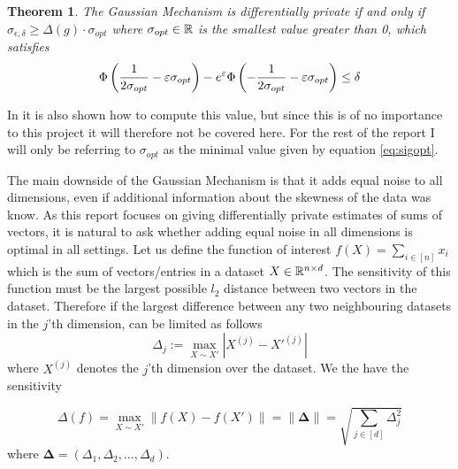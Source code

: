 \documentclass[a4paper,12pt]{article}
\newtheorem{theorem}{Theorem}
\begin{document}
\begin{theorem}\textnormal{}
\label{theo:OptSig}
The Gaussian Mechanism is differentially private if and only if $\sigma_{\epsilon, \delta} \ge \Delta(g) \cdot \sigma_{opt}$ where
$\sigma_{opt} \in \mathbb{R}$ is the smallest value greater than 0, which satisfies
\begin{equation}
\label{eq:sigopt}
    \Phi \left (\frac{1}{2\sigma_{opt}} - \varepsilon\sigma_{opt}\right) - e^{\varepsilon} \Phi \left (-\frac{1}{2\sigma_{opt}} - \varepsilon\sigma_{opt}\right) \le \delta
\end{equation}
\end{theorem}
In \cite{BalleWang} it is also shown how to compute this value, but since this is of no importance to this project it will therefore not be covered here.
For the rest of the report I will only be referring to $\sigma_{opt}$ as the minimal value given by equation \eqref{eq:sigopt}.

The main downside of the Gaussian Mechanism is that it adds equal noise to all dimensions, 
even if additional information about the skewness of the data was know.
As this report focuses on giving differentially private estimates of sums of vectors, it is natural to ask whether adding equal noise in all dimensions
is optimal in all settings. Let us define the function of interest $f(X) = \sum_{i \in [n]} x_i$ which is the sum of vectors/entries in a dataset $X \in \mathbb{R}^{n \times d}$. 
The sensitivity of this function must be the largest possible $l_2$ distance between two vectors in the dataset.
Therefore if the largest difference between any two neighbouring datasets 
in the $j$'th dimension, can be limited as follows
\begin{equation}
\label{eq:DimCon}
    \Delta_j := \max_{X \sim X'}|X^{(j)} - X'^{(j)}|
\end{equation}
where $X^{(j)}$ denotes the $j$'th dimension over the dataset.
We the have the sensitivity 

\begin{equation}
\label{eq:DelF}
    \Delta(f) = \max_{X \sim X'} \| f(X) - f(X') \| = 
    \|\bm{\Delta}\| =  \sqrt{\sum_{j \in [d]} \Delta_j^2} 
\end{equation}
where $\bm{\Delta} = (\Delta_1, \Delta_2, \dots, \Delta_d)$.
\end{document}
